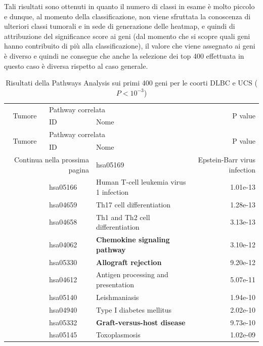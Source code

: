 Tali risultati sono ottenuti in quanto il numero di classi in esame è molto piccolo e dunque, al momento della
classificazione, non viene sfruttata la conoscenza di ulteriori classi tumorali e in sede di generazione delle heatmap, 
e quindi di attribuzione del significance score ai geni (dal momento che si scopre quali geni hanno contribuito di più 
alla classificazione), il valore che viene assegnato ai geni è diverso e quindi ne consegue che anche la selezione 
dei top 400 effettuata in questo caso è diversa rispetto al caso generale.
\begin{longtable}{cllr}
\caption{Risultati della Pathways Analysis sui primi 400 geni per le coorti DLBC e UCS ($P < 10^{-3}$)} \\
\toprule
\multirow{2}{*}{Tumore} & \multicolumn{2}{l}{Pathway correlata} & \multirow{2}{*}{P value} \\
& ID & Nome \\
\midrule
\endfirsthead
\toprule
\multirow{2}{*}{Tumore} & \multicolumn{2}{l}{Pathway correlata} & \multirow{2}{*}{P value} \\
& ID & Nome \\
\midrule
\endhead
\midrule
\multicolumn{2}{r}{Continua nella prossima pagina}
\endfoot
\bottomrule
\endlastfoot
DLBC & hsa05169 & \textcolor{\clrnew}{Epstein-Barr virus infection} & 1.43e-16\\ 
 \rowcolor{\clrmatch} & hsa05166 & Human T-cell leukemia virus 1 infection & 1.01e-13 \\ 
 & hsa04659 & \textcolor{\clrnew}{Th17 cell differentiation} & 1.28e-13 \\ 
 & hsa04658 & \textcolor{\clrnew}{Th1 and Th2 cell differentiation} & 3.13e-13 \\ 
 \rowcolor{\clrpath} & hsa04062 & \textbf{Chemokine signaling pathway} & 3.10e-12 \\ 
 \rowcolor{\clrpath} & hsa05330 & \textbf{Allograft rejection} & 9.20e-12 \\ 
 \rowcolor{\clrmatch} & hsa04612 & Antigen processing and presentation & 5.07e-11 \\ 
 \rowcolor{\clrmatch} & hsa05140 & Leishmaniasis & 1.94e-10 \\ 
 \rowcolor{\clrmatch}& hsa04940 & Type I diabetes mellitus & 2.02e-10 \\ 
 \rowcolor{\clrpath} & hsa05332 & \textbf{Graft-versus-host disease} & 9.73e-10 \\ 
 \rowcolor{\clrmatch} & hsa05145 & Toxoplasmosis & 1.02e-09 \\ 

\end{longtable}
